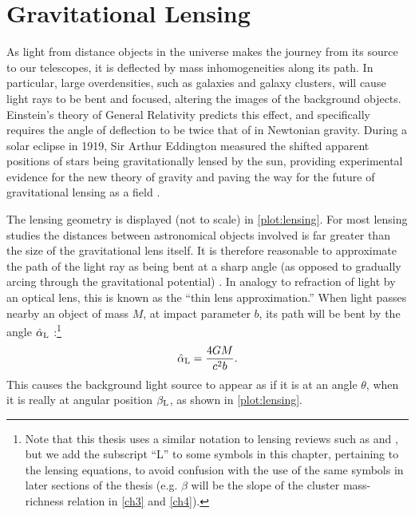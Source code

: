 \section{Gravitational Lensing}
\label{sec:Lensing}

As light from distance objects in the universe makes the journey from its source to our telescopes, it is deflected by mass inhomogeneities along its path. In particular, large overdensities, such as galaxies and galaxy clusters, will cause light rays to be bent and focused, altering the images of the background objects. Einstein's theory of General Relativity predicts this effect, and specifically requires the angle of deflection to be twice that of in Newtonian gravity. During a solar eclipse in 1919, Sir Arthur Eddington measured the shifted apparent positions of stars being gravitationally lensed by the sun, providing experimental evidence for the new theory of gravity and paving the way for the future of gravitational lensing as a field \citep{BS01}.

The lensing geometry is displayed (not to scale) in \autoref{plot:lensing}. For most lensing studies the distances between astronomical objects involved is far greater than the size of the gravitational lens itself. It is therefore reasonable to approximate the path of the light ray as being bent at a sharp angle (as opposed to gradually arcing through the gravitational potential) \citep{BS01}. In analogy to refraction of light by an optical lens, this is known as the ``thin lens approximation.'' When light passes nearby an object of mass $M$, at impact parameter $b$, its path will be bent by the angle $\hat{\alpha}_{\rm L}$ \citep{RydenText}:\footnote{Note that this thesis uses a similar notation to lensing reviews such as \citet{BS01} and \citet{Schneider06_WeakGravLens}, but we add the subscript ``L'' to some symbols in this chapter, pertaining to the lensing equations, to avoid confusion with the use of the same symbols in later sections of the thesis (e.g. $\beta$ will be the slope of the cluster mass-richness relation in \autoref{ch3} and \autoref{ch4}).}
\begin{equation}
\label{eqn:deflection}
\hat{\alpha}_{\rm L} = \frac{4GM}{c^2 b}.
\end{equation}
This causes the background light source to appear as if it is at an angle $\theta$, when it is really at angular position $\beta_{\rm L}$, as shown in \autoref{plot:lensing}.

